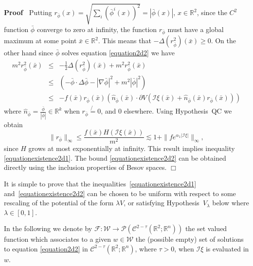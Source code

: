 \documentclass[a4paper,10pt]{article}
\newenvironment{proof}{\noindent\textbf{Proof\ }}{\hspace*{\fill}$\Box$\medskip}
\begin{document}
\begin{proof}
  Putting $r_{\bar{\phi}} (x) = \sqrt{\sum_i (\bar{\phi}^i (x))^2} = |
  \bar{\phi} (x) |$, $x \in \mathbb{R}^2$, since the $C^2$ function
  $\bar{\phi}$ converge to zero at infinity, the function $r_{\bar{\phi}}$
  must have a global maximum at some point $\bar{x} \in \mathbb{R}^2$. This
  means that $- \Delta (r^2_{\bar{\phi}}) (\bar{x}) \geqslant 0$. On the other
  hand since $\bar{\phi}$ solves equation {\eqref{equation2d2}} we have
  \begin{eqnarray}
    m^2 r^2_{\bar{\phi}} (\bar{x}) & \leqslant & - \frac{1}{2} \Delta
    (r^2_{\bar{\phi}}) (\bar{x}) + m^2 r^2_{\bar{\phi}} (\bar{x}) \nonumber\\
    & \leqslant & (- \bar{\phi} \cdot \Delta \bar{\phi} - | \nabla \bar{\phi}
    |^2 + m^2 | \bar{\phi} |^2) \nonumber\\
    & \leqslant & - f (\bar{x}) r_{\bar{\phi}} (\bar{x})
    (\hat{n}_{\bar{\phi}} (\bar{x}) \cdot \partial V (\mathcal{I} \xi
    (\bar{x}) + \hat{n}_{\bar{\phi}} (\bar{x}) r_{\bar{\phi}} (\bar{x})))
    \nonumber
  \end{eqnarray}
  where $\hat{n}_{\bar{\phi}} = \frac{\bar{\phi}}{| \bar{\phi} |} \in
  \mathbb{R}^k$ when $r_{\bar{\phi}} \not{=} 0$, and $0$ elsewhere. Using
  Hypothesis~QC we obtain
  \[ \| r_{\bar{\phi}} \|_{\infty} \leqslant \frac{f (\bar{x}) H (\mathcal{I}
     \xi (\bar{x}))}{m^2} \lesssim 1 +\|f e^{\alpha_1 | \mathcal{I} \xi |}
     \|_{\infty}, \]
  since $H$ grows at most exponentially at infinity. This result implies
  inequality {\eqref{equationexistence2d1}}. The bound
  {\eqref{equationexistence2d2}} can be obtained directly using the inclusion
  properties of Besov spaces.
\end{proof}

\begin{remark}
  \label{remark_bound}It is simple to prove that the
  inequalities~{\eqref{equationexistence2d1}}
  and~{\eqref{equationexistence2d2}} can be chosen to be uniform with respect
  to some rescaling of the potential of the form $\lambda V$, or satisfying
  Hypothesis~$V_{\lambda}$ below where $\lambda \in [0, 1]$.
\end{remark}

In the following we denote by $\mathcal{F} : \mathcal{W} \rightarrow
\mathcal{P} (\mathcal{C}^{2 - \tau} (\mathbb{R}^2 ; \mathbb{R}^n))$ the set
valued function which associates to a given $w \in \mathcal{W}$ the (possible
empty) set of solutions to equation {\eqref{equation2d2}} in $\mathcal{C}^{2 -
\tau} (\mathbb{R}^2 ; \mathbb{R}^n)$, where $\tau > 0$, when $\mathcal{I} \xi$
is evaluated in $w$.
\end{document}
